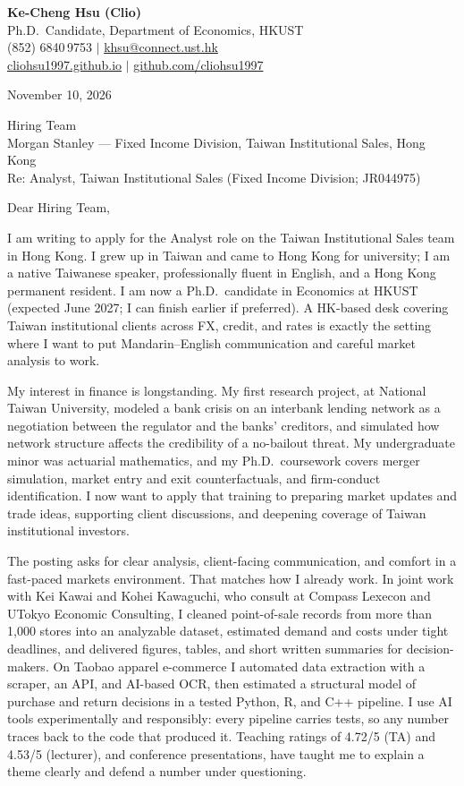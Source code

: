 \documentclass[11pt,letterpaper]{article}
\begin{document}
\noindent
{\bfseries Ke-Cheng Hsu (Clio)}\\
Ph.D.\ Candidate, Department of Economics, HKUST\\
(852) 6840\,9753 \quad $|$ \quad \href{mailto:khsu@connect.ust.hk}{khsu@connect.ust.hk}\\
\href{https://cliohsu1997.github.io/}{cliohsu1997.github.io} \quad $|$ \quad \href{https://github.com/cliohsu1997}{github.com/cliohsu1997}

\vspace{0.5em}
\noindent
November 10, 2026

\vspace{0.35em}
\noindent
Hiring Team\\
Morgan Stanley --- Fixed Income Division, Taiwan Institutional Sales, Hong Kong\\
Re: Analyst, Taiwan Institutional Sales (Fixed Income Division; JR044975)

\vspace{0.2em}
Dear Hiring Team,

I am writing to apply for the Analyst role on the Taiwan Institutional Sales team in Hong Kong. I grew up in Taiwan and came to Hong Kong for university; I am a native Taiwanese speaker, professionally fluent in English, and a Hong Kong permanent resident. I am now a Ph.D.\ candidate in Economics at HKUST (expected June 2027; I can finish earlier if preferred). A HK-based desk covering Taiwan institutional clients across FX, credit, and rates is exactly the setting where I want to put Mandarin--English communication and careful market analysis to work.

My interest in finance is longstanding. My first research project, at National Taiwan University, modeled a bank crisis on an interbank lending network as a negotiation between the regulator and the banks' creditors, and simulated how network structure affects the credibility of a no-bailout threat. My undergraduate minor was actuarial mathematics, and my Ph.D.\ coursework covers merger simulation, market entry and exit counterfactuals, and firm-conduct identification. I now want to apply that training to preparing market updates and trade ideas, supporting client discussions, and deepening coverage of Taiwan institutional investors.

The posting asks for clear analysis, client-facing communication, and comfort in a fast-paced markets environment. That matches how I already work. In joint work with Kei Kawai and Kohei Kawaguchi, who consult at Compass Lexecon and UTokyo Economic Consulting, I cleaned point-of-sale records from more than 1{,}000 stores into an analyzable dataset, estimated demand and costs under tight deadlines, and delivered figures, tables, and short written summaries for decision-makers. On Taobao apparel e-commerce I automated data extraction with a scraper, an API, and AI-based OCR, then estimated a structural model of purchase and return decisions in a tested Python, R, and C++ pipeline. I use AI tools experimentally and responsibly: every pipeline carries tests, so any number traces back to the code that produced it. Teaching ratings of 4.72/5 (TA) and 4.53/5 (lecturer), and conference presentations, have taught me to explain a theme clearly and defend a number under questioning.
\end{document}

